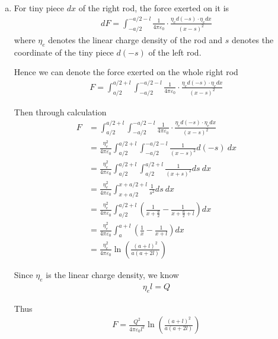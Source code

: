 \documentclass[12pt,a4paper]{article}
\begin{document}
\begin{enumerate}[(a)]
    \item For tiny piece $dx$ of the right rod, the force exerted on it is
    \begin{align}
        dF = \int_{-a/2}^{-a/2-l} \frac{1}{4\pi\varepsilon_0} \cdot \frac{\eta_e d(-s) \cdot \eta_e dx}{(x-s)^2}
    \end{align}
    where $\eta_e$ denotes the linear charge density of the rod and $s$ denotes the coordinate of the tiny piece $d(-s)$ of the left rod.
    
    Hence we can denote the force exerted on the whole right rod
    \begin{align}
        F = \int_{a/2}^{a/2+l} \int_{-a/2}^{-a/2-l} \frac{1}{4\pi\varepsilon_0} \cdot \frac{\eta_e d(-s) \cdot \eta_e dx}{(x-s)^2}
    \end{align}
    
    Then through calculation
    \begin{align}
         F &= \int_{a/2}^{a/2+l} \int_{-a/2}^{-a/2-l} \frac{1}{4\pi\varepsilon_0} \cdot \frac{\eta_e d(-s) \cdot \eta_e dx}{(x-s)^2} \nonumber \\
         &= \frac{\eta_e ^2}{4\pi\varepsilon_0} \int_{a/2}^{a/2+l} \int_{-a/2}^{-a/2-l} \frac{1}{(x-s)^2} d(-s)\ dx \nonumber \\
         &= \frac{\eta_e ^2}{4\pi\varepsilon_0} \int_{a/2}^{a/2+l} \int_{a/2}^{a/2+l} \frac{1}{(x+s)^2} ds\ dx \nonumber \\
         &= \frac{\eta_e ^2}{4\pi\varepsilon_0} \int_{x+a/2}^{x+a/2+l} \frac{1}{s^2} ds\ dx \nonumber \\
         &= \frac{\eta_e ^2}{4\pi\varepsilon_0} \int_{a/2}^{a/2+l} \left( \frac{1}{x+\frac{a}{2}} - \frac{1}{x+\frac{a}{2}+l} \right) dx \nonumber \\
         &= \frac{\eta_e ^2}{4\pi\varepsilon_0} \int_{a}^{a+l} \left( \frac{1}{x} - \frac{1}{x+l} \right) dx \nonumber \\
         &= \frac{\eta_e ^2}{4\pi\varepsilon_0} \ln \left( \frac{(a+l)^2}{a(a+2l)} \right)
    \end{align}
    
    Since $\eta_e$ is the linear charge density, we know
    \begin{align}
        \eta_e l = Q
    \end{align}
    
    Thus
    \begin{align}
        F = \frac{Q^2}{4\pi\varepsilon_0 l^2} \ln \left( \frac{(a+l)^2}{a(a+2l)} \right)
        \label{4-force}
    \end{align}
    

\end{enumerate}
\end{document}
